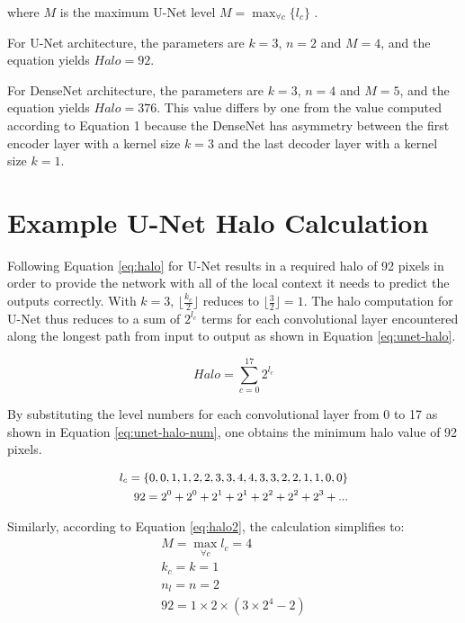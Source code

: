 \documentclass[10pt, indentfirst]{article}
\begin{document}
\noindent
where $M$ is the maximum U-Net level $M = \max_{\forall c}\{ l_{c} \}$ .

For U-Net architecture, the parameters are $k = 3$, $n=2$ and $M=4$, and the equation yields $Halo=92$.

For DenseNet architecture, the parameters are $k = 3$, $n=4$ and $M=5$, and the equation yields $Halo=376$.
This value differs by one from the value computed according to Equation 1 because the DenseNet has asymmetry between the first encoder layer with a kernel size $k = 3$ and the last decoder layer with a kernel size $k = 1$.


\section{Example U-Net Halo Calculation}

Following Equation \ref{eq:halo} for U-Net results in a required halo of 92 pixels in order to provide the network with all of the local context it needs to predict the outputs correctly.
With $k = 3$, $\lfloor \frac{k_c}{2} \rfloor$ reduces to $\lfloor \frac{3}{2} \rfloor = 1$.
The halo computation for U-Net thus reduces to a sum of $2^{l_c}$ terms for each convolutional layer encountered along the longest path from input to output as shown in Equation \ref{eq:unet-halo}.

\begin{equation}
Halo = \sum_{c=0}^{17} 2^{l_c}
\label{eq:unet-halo}
\end{equation}

By substituting the level numbers for each convolutional layer from 0 to 17 as shown in Equation \ref{eq:unet-halo-num}, one obtains the minimum halo value of 92 pixels.

\begin{equation}
\begin{small}
\begin{aligned} 
l_c = \{0, 0, 1, 1, 2, 2, 3, 3, 4, 4, 3, 3, 2, 2, 1, 1, 0, 0\} \\
92 = 2^0 + 2^0 + 2^1 + 2^1 + 2^2 + 2^2 + 2^3 + ...
\end{aligned}
\end{small}
\label{eq:unet-halo-num}
\end{equation}

Similarly, according to Equation \ref{eq:halo2}, the calculation simplifies to:
\begin{equation}
\begin{aligned} 
M=\max_{\forall c} { l_c } = 4\\
k_c = k = 1  \\
n_l = n = 2 \\
92 = 1 \times 2 \times (3 \times 2^4 - 2)
\end{aligned}
\label{eq:unet-halo-num2}
\end{equation}
\end{document}
